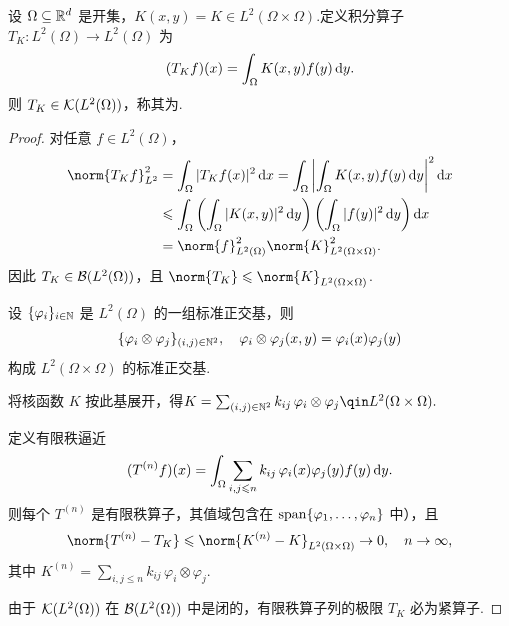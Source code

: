 \begin{proposition}[积分核算子]
设 $\Omega\subseteq\mathbb{R}^d$ 是开集，$K(x,y) = K\in L^2(\Omega\times\Omega)$.定义积分算子 $T_K:L^2(\Omega)\to L^2(\Omega)$ 为
\begin{equation*}
(T_K f)(x) = \int_{\Omega} K(x,y) f(y)\mathop{}\!\mathrm{d} y.
\end{equation*}
则 $T_K\in\mathcal{K}(L^2(\Omega))$，称其为.
\end{proposition}
\begin{proof}
 对任意 $f\in L^2(\Omega)$，
\begin{align*}
\norm{T_K f}_{L^2}^2
&= \int_{\Omega} |T_K f(x)|^2\d x
= \int_{\Omega} \left|\int_{\Omega} K(x,y) f(y)\d y\right|^2 \d x \\
&\leq \int_{\Omega} \left(\int_{\Omega} |K(x,y)|^2\d y\right) \left(\int_{\Omega} |f(y)|^2\d y\right) \d x \\
&= \norm{f}_{L^2(\Omega)}^2 \norm{K}_{L^2(\Omega\times\Omega)}^2.
\end{align*}
因此 $T_K\in\mathcal{B}(L^2(\Omega))$，且 $\norm{T_K}\leq\norm{K}_{L^2(\Omega\times\Omega)}$.\par
{} 设 $\{\varphi_i\}_{i\in\mathbb{N}}$ 是 $L^2(\Omega)$ 的一组标准正交基，则
\begin{equation*}
\{\varphi_i\otimes\varphi_j\}_{(i,j)\in\mathbb{N}^2},\quad \varphi_i\otimes\varphi_j(x,y) = \varphi_i(x)\varphi_j(y)
\end{equation*}
构成 $L^2(\Omega\times\Omega)$ 的标准正交基.\par
将核函数 $K$ 按此基展开，得$K = \sum_{(i,j)\in\mb{N}^2} k_{ij}\, \varphi_i\otimes\varphi_j \qin L^2(\Omega\times\Omega).$\par

定义有限秩逼近
\begin{equation*}
(T^{(n)} f)(x) = \int_{\Omega} \sum_{i,j\leqslant n} k_{ij}\, \varphi_i(x)\varphi_j(y) f(y)\mathop{}\!\mathrm{d} y.
\end{equation*}
则每个 $T^{(n)}$ 是有限秩算子，其值域包含在 $\operatorname{span}\{\varphi_1,\dots,\varphi_n\}$ 中），且
\begin{equation*}
\norm{T^{(n)} - T_K} \leq \norm{K^{(n)} - K}_{L^2(\Omega\times\Omega)}\to 0,\quad n\to\infty,
\end{equation*}
其中 $K^{(n)} = \sum_{i,j\leq n} k_{ij}\,\varphi_i\otimes\varphi_j$.\par
由于 $\mathcal{K}(L^2(\Omega))$ 在 $\mathcal{B}(L^2(\Omega))$ 中是闭的，有限秩算子列的极限 $T_K$ 必为紧算子.
\end{proof}


